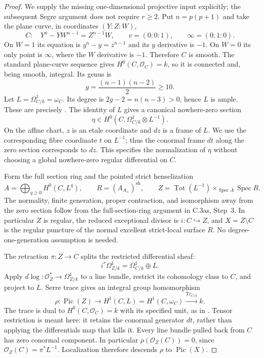 \begin{proof}
We supply the missing one-dimensional projective input explicitly;
the subsequent Segre argument does not require $r\ge2$.
Put $n=p(p+1)$ and take the plane curve, in coordinates $(Y:Z:W)$,
\[
 C:\quad Y^n-YW^{n-1}=Z^{n-1}W,\qquad
 v=(0:0:1),\qquad \infty=(0:1:0).
\]
On $W=1$ its equation is $y^n-y=z^{n-1}$ and its $y$
derivative is $-1$. On $W=0$ its only point is $\infty$, where
the $W$ derivative is $-1$. Therefore $C$ is smooth.
The standard plane-curve sequence gives $H^0(C,\mathcal O_C)=k$,
so it is connected and, being smooth, integral. Its genus is
\[
                         g=\frac{(n-1)(n-2)}2\ge10.
\]
Let $L=\Omega^1_{C/k}=\omega_C$. Its degree is
$2g-2=n(n-3)>0$, hence $L$ is ample. These are precisely
\citet[Lemmas 53.9.3, 53.8.4 and 33.44.14]{D_StacksCurveEndpoint}.
The identity of $L$ gives a canonical nowhere-zero section
\[
                \eta\in H^0(C,\Omega^1_{C/k}\otimes L^{-1}).
\]
On the affine chart, $z$ is an etale coordinate and $dz$ is a frame
of $L$. We use the corresponding fibre coordinate $t$ on $L^{-1}$;
thus the conormal frame $dt$ along the zero section corresponds to
$dz$. This specifies the normalization of $\eta$ without choosing
a global nowhere-zero regular differential on $C$.

Form the full section ring and the pointed strict henselization
\[
 A=\bigoplus_{q\ge0}H^0(C,L^q),\qquad
 R=(A_{A_+})^{\mathrm{sh}},\qquad
 Z=\operatorname{Tot}(L^{-1})\times_{\operatorname{Spec}A}
                                           \operatorname{Spec}R.
\]
The normality, finite generation, proper contraction, and isomorphism
away from the zero section follow from the full-section-ring argument
in C.3as, Step~3. In particular $Z$ is regular, the reduced exceptional
divisor is $i:C\hookrightarrow Z$, and $X=Z\setminus C$ is the
regular puncture of the normal excellent strict-local surface $R$.
No degree-one-generation assumption is needed.

The retraction $\pi:Z\to C$ splits the restricted differential sheaf:
\[
                   i^*\Omega^1_{Z/k}=\Omega^1_{C/k}\oplus L.
\]
Apply $d\log:\mathcal O_Z^*\to\Omega^1_{Z/k}$ to a line bundle,
restrict its cohomology class to $C$, and project to $L$. Serre trace
gives an integral group homomorphism
\[
 \rho:\operatorname{Pic}(Z)\longrightarrow H^1(C,L)
            =H^1(C,\omega_C)\xrightarrow{\operatorname{Tr}_{C/k}}k.
\]
The trace is dual to $H^0(C,\mathcal O_C)=k$ with its specified
unit, as in \citet[Lemma~48.27.1(5--7) and
Remarks~48.27.2--3]{D_Stacks0FVU}.
Tensor restriction is meant here: it retains the conormal generator
$dt$, rather than applying the differentials map that kills it.
Every line bundle pulled back from $C$ has zero conormal component.
In particular $\rho(\mathcal O_Z(C))=0$, since
$\mathcal O_Z(C)=\pi^*L^{-1}$. Localization therefore descends
$\rho$ to $\operatorname{Pic}(X)$.


\end{proof}
